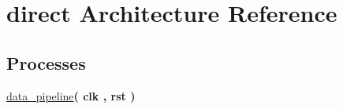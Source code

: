 \hypertarget{classlfsr__internal_1_1direct}{\section{direct Architecture Reference}
\label{classlfsr__internal_1_1direct}
}
\subsection*{Processes}
 \begin{DoxyCompactItemize}
\item 
\hypertarget{classlfsr__internal_1_1direct_ab0a54e92d710dc996e125e7c3c005889}{\hyperlink{classlfsr__internal_1_1direct_ab0a54e92d710dc996e125e7c3c005889}{data\-\_\-pipeline}{\bfseries  ( {\bfseries \textcolor{vhdlchar}{clk}\textcolor{vhdlchar}{ }\textcolor{vhdlchar}{ }\textcolor{vhdlchar}{ }} , {\bfseries \textcolor{vhdlchar}{rst}\textcolor{vhdlchar}{ }} )}}\label{classlfsr__internal_1_1direct_ab0a54e92d710dc996e125e7c3c005889}

\end{DoxyCompactItemize}
